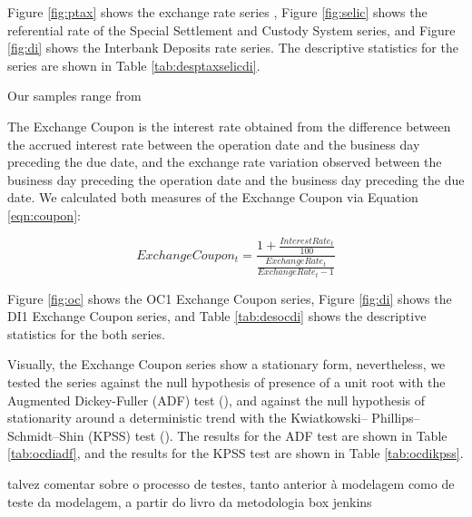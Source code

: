 \documentclass[cic,tc, english]{iiufrgs}
\begin{document}
    Figure \ref{fig:ptax} shows the exchange rate series , Figure \ref{fig:selic} shows the referential rate of the Special Settlement and Custody System series, and Figure \ref{fig:di} shows the Interbank Deposits rate series. The descriptive statistics for the series are shown in Table \ref{tab:desptaxselicdi}.

    

    

    

    

    Our samples range from 

    The Exchange Coupon is the interest rate obtained from the difference between the accrued interest rate between the operation date and the business day preceding the due date, and the exchange rate variation observed between the business day preceding the operation date and the business day preceding the due date. We calculated both measures of the Exchange Coupon via Equation \ref{eqn:coupon}:

    \begin{equation}
        \label{eqn:coupon}
        ExchangeCoupon_t = \frac{1 + \frac{InterestRate_t}{100}}{\frac{ExchangeRate_t}{ExchangeRate_t-1}}
    \end{equation}

    Figure \ref{fig:oc} shows the OC1 Exchange Coupon series, Figure \ref{fig:di} shows the DI1 Exchange Coupon series, and Table \ref{tab:desocdi} shows the descriptive statistics for the both series.

    

    

    

    Visually, the Exchange Coupon series show a stationary form, nevertheless, we tested the series against the null hypothesis of presence of a unit root with the Augmented Dickey-Fuller (ADF) test (\citet{adf}), and against the null hypothesis of stationarity around a deterministic trend with the Kwiatkowski– Phillips–Schmidt–Shin (KPSS) test (\citet{kpss}). The results for the ADF test are shown in Table \ref{tab:ocdiadf}, and the results for the KPSS test are shown in Table \ref{tab:ocdikpss}.

    {talvez comentar sobre o processo de testes, tanto anterior à modelagem como de teste da modelagem, a partir do livro da metodologia box jenkins}
\end{document}
